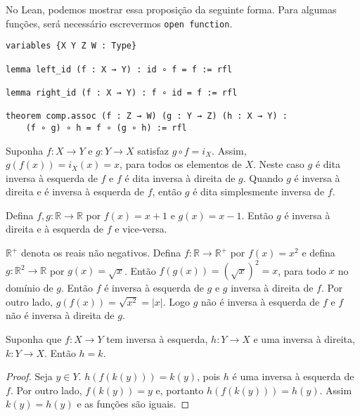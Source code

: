 No Lean, podemos mostrar essa proposição da seguinte forma. Para algumas funções, será necessário
escrevermos \lstinline{open function}.

\begin{lstlisting}
variables {X Y Z W : Type}

lemma left_id (f : X → Y) : id ∘ f = f := rfl

lemma right_id (f : X → Y) : f ∘ id = f := rfl

theorem comp.assoc (f : Z → W) (g : Y → Z) (h : X → Y) :
    (f ∘ g) ∘ h = f ∘ (g ∘ h) := rfl

\end{lstlisting}

\begin{definition}
    \label{def4}
    Suponha $f:X \to Y$ e $g : Y \to X$ satisfaz $g \circ f = i_X$. Assim,
    $g(f(x)) = i_X(x) = x$, para todos os elementos de $X$. Neste caso $g$ é dita inversa à esquerda
    de $f$ e $f$ é dita inversa à direita de $g$. Quando $g$ é inversa à direita e é inversa à esquerda
    de $f$, então $g$ é dita simplesmente inversa de $f$.
\end{definition}

\begin{example}
    \label{ex1}
    Defina $f,g : \mathbb{R} \to \mathbb{R}$ por $f(x) = x + 1$ e $g(x) = x - 1$. Então $g$
    é inversa à direita e à esquerda de $f$ e vice-versa.
\end{example}
\begin{example}
    \label{ex2}
    $\mathbb{R}^{+}$ denota os reais não negativos. Defina $f : \mathbb{R} \to \mathbb{R}^{+}$
    por $f(x) = x^2$ e defina $g : \mathbb{R}^2 \to \mathbb{R}$ por $g(x) = \sqrt{x}$. Então
    $f(g(x)) = (\sqrt{x})^2 = x$, para todo $x$ no domínio de $g$. Então $f$ é inversa à esquerda de $g$
    e $g$ inversa à direita de $f$. Por outro lado, $g(f(x)) = \sqrt{x^2} = |x|$. Logo $g$ não é inversa à
    esquerda de $f$ e $f$ não é inversa à direita de $g$.
\end{example}

\begin{theorem}
    \label{prop2}
    Suponha que $f : X \to Y $ tem inversa à esquerda, $h : Y \to X $ e uma inversa à direita, $k : Y \to X $.
    Então $h = k$.
\end{theorem}
\begin{proof}
    Seja $y \in Y$. $h(f(k(y))) = k(y)$, pois $h$ é uma inversa à esquerda de $f$.
    Por outro lado, $f(k(y)) = y$ e, portanto $h(f(k(y))) = h(y)$. Assim $k(y) = h(y) $ e as funções são iguais.
\end{proof}

